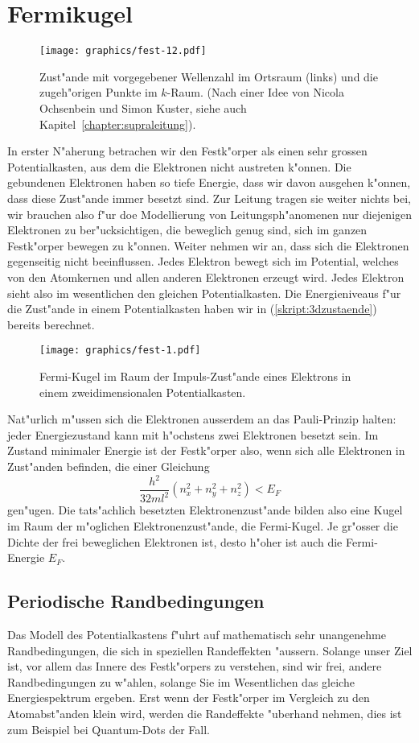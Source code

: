\section{Fermikugel}
\begin{figure}
\centering
\texttt{[image: graphics/fest-12.pdf]}
\caption{Zust"ande mit vorgegebener Wellenzahl im Ortsraum (links) und
die zugeh"origen Punkte im $k$-Raum.
(Nach einer Idee von Nicola Ochsenbein und Simon Kuster, siehe auch
Kapitel~\ref{chapter:supraleitung}).
\label{skript:kraum}}
\end{figure}
In erster N"aherung betrachen wir den Festk"orper als einen
sehr grossen Potentialkasten, aus dem die Elektronen nicht austreten
k"onnen.
Die gebundenen Elektronen haben so tiefe Energie, dass wir davon
ausgehen k"onnen, dass diese Zust"ande immer besetzt sind.
Zur Leitung tragen sie weiter nichts bei, wir brauchen also f"ur
doe Modellierung von Leitungsph"anomenen nur diejenigen Elektronen
zu ber"ucksichtigen, die beweglich genug sind, sich im ganzen
Festk"orper bewegen zu k"onnen.
Weiter nehmen wir an, dass sich die Elektronen gegenseitig 
nicht beeinflussen.
Jedes Elektron bewegt sich im Potential, welches von den Atomkernen
und allen anderen Elektronen erzeugt wird.
Jedes Elektron sieht also im wesentlichen den gleichen Potentialkasten.
Die Energieniveaus f"ur die Zust"ande in einem Potentialkasten haben
wir in (\ref{skript:3dzustaende}) bereits berechnet.
\begin{figure}
\centering
\texttt{[image: graphics/fest-1.pdf]}
\caption{Fermi-Kugel im Raum der Impuls-Zust"ande eines Elektrons in einem
zweidimensionalen Potentialkasten.
\label{skript:fermi-kugel}}
\end{figure}
Nat"urlich m"ussen sich die Elektronen ausserdem an das Pauli-Prinzip
halten: jeder Energiezustand kann mit h"ochstens zwei Elektronen
besetzt sein. 
Im Zustand minimaler Energie ist der Festk"orper also, wenn sich
alle Elektronen in Zust"anden befinden, die einer Gleichung
\[
\frac{h^2}{32ml^2}(
n_x^2
+
n_y^2
+
n_z^2
)
<
E_F
\]
gen"ugen.
Die tats"achlich besetzten Elektronenzust"ande bilden also eine Kugel
im Raum der m"oglichen Elektronenzust"ande, die Fermi-Kugel.
Je gr"osser die Dichte der frei beweglichen Elektronen ist, desto
h"oher ist auch die Fermi-Energie $E_F$.


\subsection{Periodische Randbedingungen}
Das Modell des Potentialkastens f"uhrt auf mathematisch sehr unangenehme
Randbedingungen, die sich in speziellen Randeffekten "aussern.
Solange unser Ziel ist, vor allem das Innere des Festk"orpers zu verstehen,
sind wir frei, andere Randbedingungen zu w"ahlen, solange Sie im Wesentlichen
das gleiche Energiespektrum ergeben. Erst wenn der Festk"orper im Vergleich
zu den Atomabst"anden klein wird, werden die Randeffekte "uberhand nehmen,
dies ist zum Beispiel bei Quantum-Dots der Fall. 

